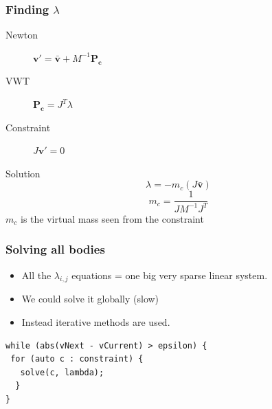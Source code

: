 \documentclass{beamer}
\begin{document}
\begin{frame}
 \frametitle{Finding $\lambda$}
  \begin{description}
   \item[Newton] $\mathbf{v'} = \bar{\mathbf{v}} + M^{-1} \mathbf{P_{c}}$
   \item[VWT] $\mathbf{P_c} = J^T \lambda$
   \item[Constraint] $J\mathbf{v'} = 0$
  \end{description}  
  \pause
  \begin{block}{Solution}
   \[ \lambda = -m_c (J \bar{\mathbf{v}})\]
   \[ m_c = \frac{1}{J M^{-1}J^T} \]
   $m_c$ is the virtual mass seen from the constraint
  \end{block}
\end{frame}

\begin{frame}[fragile]
 \frametitle{Solving all bodies}
  \begin{itemize}
   \item All the $\lambda_{i,j}$ equations = one big very sparse linear system.
   \pause
   \item We could solve it globally (slow)
   \pause
   \item Instead iterative methods are used.
  \end{itemize}
  \begin{lstlisting}
while (abs(vNext - vCurrent) > epsilon) {
 for (auto c : constraint) {
   solve(c, lambda);
  }
}
  \end{lstlisting}
\end{frame}
\end{document}
